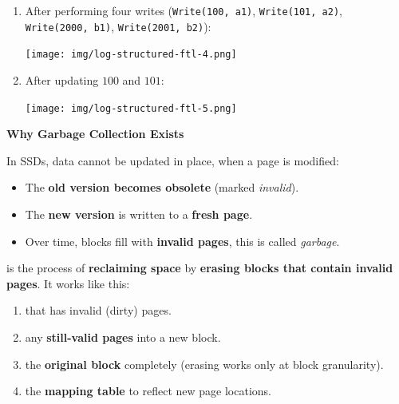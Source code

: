 \begin{examplebox}
\begin{enumerate}
        \item After performing four writes (\texttt{Write(100, a1)}, \texttt{Write(101, a2)}, \texttt{Write(2000, b1)}, \texttt{Write(2001, b2)}):
        \begin{center}
            \texttt{[image: img/log-structured-ftl-4.png]}
        \end{center}

        \item After updating $100$ and $101$:
        \begin{center}
            \texttt{[image: img/log-structured-ftl-5.png]}
        \end{center}
    \end{enumerate}
\end{examplebox}

\highspace
\begin{flushleft}
    \textcolor{Green3}{ \textbf{Why Garbage Collection Exists}}
\end{flushleft}
In SSDs, data cannot be updated in place, when a page is modified:
\begin{itemize}
    \item The \textbf{old version becomes obsolete} (marked \emph{invalid}).
    \item The \textbf{new version} is written to a \textbf{fresh page}.
    \item Over time, blocks fill with \textbf{invalid pages}, this is called \emph{garbage}.
\end{itemize}
 is the process of \textbf{reclaiming space} by \textbf{erasing blocks that contain invalid pages}. It works like this:
\begin{enumerate}
    \item {} that has invalid (dirty) pages.
    \item {} any \textbf{still-valid pages} into a new block.
    \item {} the \textbf{original block} completely (erasing works only at block granularity).
    \item {} the \textbf{mapping table} to reflect new page locations.
\end{enumerate}

